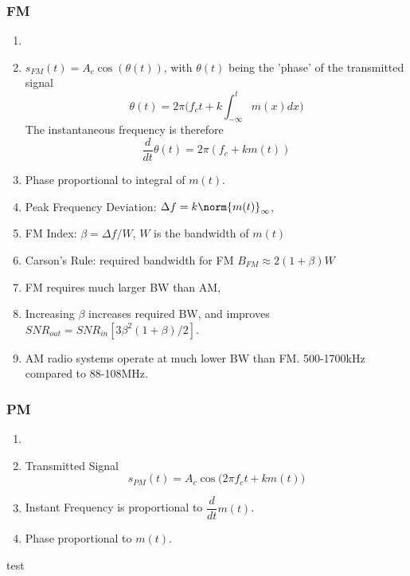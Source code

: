 \documentclass[../../main.tex]{subfiles}
\begin{document}
\subsubsection{FM}
\begin{wtr}
\begin{enumerate}
    \item[]
    \item $s_{FM}(t) = A_c\cos(\theta(t))$, with $\theta(t)$ being the 'phase' of the transmitted signal
    \[
    \theta(t) = 2\pi\biggl(f_ct + k\int^{t}_{-\infty}m(x)dx\biggr)
    \]
    The instantaneous frequency is therefore
    \[
    \dfrac{d}{dt}\theta(t) = 2\pi(f_c + km(t))
    \]
    \item Phase proportional to integral of $m(t)$.
    \item Peak Frequency Deviation: $\Delta f = k\norm{m(t)}_{\infty}$,
    \item FM Index: $\beta = \Delta f/W$, $W$ is the bandwidth of $m(t)$
    \item Carson's Rule: required bandwidth for FM $B_{FM}\approx 2(1+\beta)W$
    \item FM requires much larger BW than AM,
    \item Increasing $\beta$ increases required BW, and improves $SNR_{out}=SNR_{in}[3\beta^2(1+\beta)/2]$.
    \item AM radio systems operate at much lower BW than FM. 500-1700kHz compared to 88-108MHz.
\end{enumerate}
\end{wtr}
\subsubsection{PM}
\begin{wtr}
    \begin{enumerate}
        \item[]
        \item Transmitted Signal
        \[
        s_{PM}(t) = A_c\cos\biggl(2\pi f_c t + km(t)\biggr)
        \]
        \item Instant Frequency is proportional to $\dfrac{d}{dt}m(t)$.
        \item Phase proportional to $m(t)$.
    \end{enumerate}
\end{wtr}

test
\end{document}
